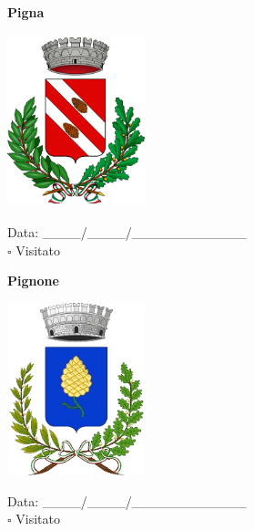 \documentclass[a5paper,12pt]{article}
\begin{document}
\newpage

\noindent
\begin{minipage}[t]{0.45\textwidth}
    \begin{center}
        \textbf{Pigna}
    \end{center}
    \vspace{-0.5cm} %
    \begin{center}
        \includegraphics[height= 5cm, width=4cm]{Liguria/Stemma Pigna.png}
    \end{center}
    \vspace{-0.4cm} %
    \begin{flushleft}
        Data: \_\_\_\_/\_\_\_\_/\_\_\_\_\_\_\_\_\_\_\_\_ \\
        $\square$ Visitato
    \end{flushleft}
\end{minipage}
\hfill
\noindent
\begin{minipage}[t]{0.45\textwidth}
    \begin{center}
        \textbf{Pignone}
    \end{center}
    \vspace{-0.5cm} %
    \begin{center}
        \includegraphics[height= 5cm, width=4cm]{Liguria/Stemma Pignone.png}
    \end{center}
    \vspace{-0.4cm} %
    \begin{flushleft}
        Data: \_\_\_\_/\_\_\_\_/\_\_\_\_\_\_\_\_\_\_\_\_ \\
        $\square$ Visitato
    \end{flushleft}
\end{minipage}
\end{document}
